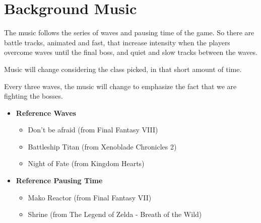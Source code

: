 \documentclass[12pt]{article}
\begin{document}
\newpage

\section{Background Music}

The music follows the series of waves and pausing time of the game. So there are battle tracks, animated and fast, that increase intensity when the players overcome waves until the final boss, and quiet and slow tracks between the waves.

Music will change considering the class picked, in that short amount of time.

Every three waves, the music will change to emphasize the fact that we are fighting the bosses.

\begin{itemize}
	\item \textbf{Reference Waves}
	\begin{itemize}
		\item Don’t be afraid (from Final Fantasy VIII)
		\item Battleship Titan (from Xenoblade Chronicles 2)
		\item Night of Fate (from Kingdom Hearts)
	\end{itemize}
	\item \textbf{Reference Pausing Time}
	\begin{itemize}
		\item Mako Reactor (from Final Fantasy VII)
		\item Shrine (from The Legend of Zelda - Breath of the Wild)
	\end{itemize}
\end{itemize}


\end{document}
